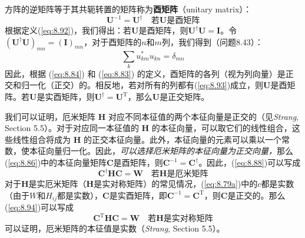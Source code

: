     方阵的逆矩阵等于其共轭转置的矩阵称为\textbf{酉矩阵}（unitary matrix）：
    \begin{equation}
        \mathbf{U}^{-1} = \mathbf{U}^{\dagger} \quad \text{若} \mathbf{U} \text{是酉矩阵}
        \label{eq:8.92}
    \end{equation}
    根据定义(\ref{eq:8.92})，我们得出：若$\mathbf{U}$是酉矩阵，则$\mathbf{U}^{\dagger}\mathbf{U} = \mathbf{I}$。令$\left(\mathbf{U}^{\dagger}\mathbf{U}\right)_{mn} = \left(\mathbf{I}\right)_{mn}$，对于酉矩阵的$n$和$m$列，我们得到（问题8.43）：
    \begin{equation}
        \sum_{k} u_{km}^{\ast}u_{kn} = \delta_{mn}
        \label{eq:8.93}
    \end{equation}
    因此，根据 (\ref{eq:8.84}) 和 (\ref{eq:8.83}) 的定义，酉矩阵的各列（视为列向量）是正交和归一化（正交）的。相反地，若对所有的列都有(\ref{eq:8.93})成立，则$\mathbf{U}$是酉矩阵。若$\mathbf{U}$是实酉矩阵，则$\mathbf{U}^{\dagger} = \mathbf{U}^{\mathrm{T}}$，那么$\mathbf{U}$是正交矩阵。

    我们可以证明，厄米矩阵 $\mathbf{H}$ 对应不同本征值的两个本征向量是正交的（见\textit{Strang}, Section 5.5）。对于对应同一本征值的 $\mathbf{H}$ 的本征向量，可以取它们的线性组合，这些线性组合将成为 $\mathbf{H}$ 的正交本征向量。此外，本征向量的元素可以乘以一个常数，使本征向量归一化。因此，\textit{可以选择厄米矩阵的本征向量为正交向量，}那么(\ref{eq:8.86})中的本征向量矩阵$\mathbf{C}$是酉矩阵，则$\mathbf{C}^{-1} = \mathbf{C}^{\dagger}$。因此，(\ref{eq:8.88})可以写成
    \begin{equation}
        \mathbf{C}^{\dagger}\mathbf{H}\mathbf{C} = \mathbf{W} \quad \text{若} \mathbf{H} \text{是厄米矩阵}
        \label{eq:8.94}
    \end{equation}
    对于$\mathbf{H}$是实厄米矩阵（$\mathbf{H}$是实对称矩阵）的常见情况，(\ref{eq:8.79a})中的$c$都是实数（由于$W$和$H_{ij}$都是实数），$\mathbf{C}$是实酉矩阵，即$\mathbf{C}^{-1} = \mathbf{C}^{\mathrm{T}}$，则$\mathbf{C}$是正交的。那么(\ref{eq:8.94})可以写成
    \begin{equation}
        \mathbf{C}^{\mathrm{T}}\mathbf{H}\mathbf{C} = \mathbf{W} \quad \text{若} \mathbf{H} \text{是实对称矩阵}
        \label{eq:8.95}
    \end{equation}
    可以证明，厄米矩阵的本征值是实数（\textit{Strang}, Section 5.5）。


